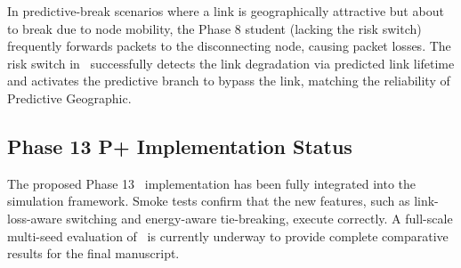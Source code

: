 In predictive-break scenarios where a link is geographically attractive but about to break due to node mobility, the Phase 8 student (lacking the risk switch) frequently forwards packets to the disconnecting node, causing packet losses. The risk switch in \phaseTwelve\ successfully detects the link degradation via predicted link lifetime and activates the predictive branch to bypass the link, matching the reliability of Predictive Geographic.

\subsection{Phase 13 P+ Implementation Status}
The proposed Phase 13 \method\ implementation has been fully integrated into the simulation framework. Smoke tests confirm that the new features, such as link-loss-aware switching and energy-aware tie-breaking, execute correctly. A full-scale multi-seed evaluation of \method\ is currently underway to provide complete comparative results for the final manuscript.

